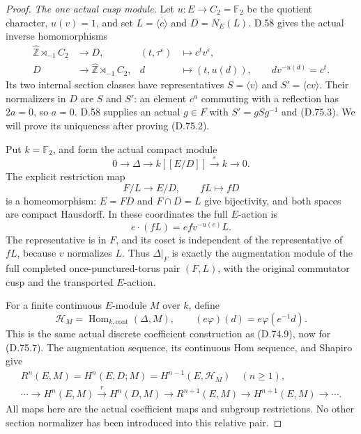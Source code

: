 \begin{proof}
\emph{The one actual cusp module.}
Let $u:E\to C_2=\mathbb F_2$ be the quotient character,
$u(v)=1$, and set
$L=\overline{\langle c\rangle}$ and $D=N_E(L)$.
D.58 gives the actual inverse homomorphisms
\[
 \begin{aligned}
 \widehat{\mathbb Z}\rtimes_{-1}C_2
        &\longrightarrow D,
        &(t,\tau^\epsilon)&\longmapsto c^t v^\epsilon,\\
 D&\longrightarrow\widehat{\mathbb Z}\rtimes_{-1}C_2,
        &d&\longmapsto(t,u(d)),
        \qquad d v^{-u(d)}=c^t .
 \end{aligned}                                             \tag{D.75.6}
\]
Its two internal section classes have representatives
$S=\langle v\rangle$ and $S'=\langle cv\rangle$.
Their normalizers in $D$ are $S$ and $S'$:
an element $c^a$ commuting with a reflection has
$2a=0$, so $a=0$.  D.58 supplies an actual
$g\in F$ with $S'=gSg^{-1}$ and (D.75.3).
We will prove its uniqueness after proving (D.75.2).

Put $k=\mathbb F_2$, and form the actual compact module
\[
 0\longrightarrow\Delta
 \longrightarrow k[[E/D]]
            \xrightarrow{\ \varepsilon\ }k\longrightarrow0 .
                                                               \tag{D.75.7}
\]
The explicit restriction map
\[
            F/L\longrightarrow E/D,\qquad fL\longmapsto fD
                                                               \tag{D.75.8}
\]
is a homeomorphism: $E=FD$ and $F\cap D=L$
give bijectivity, and both spaces are compact Hausdorff.
In these coordinates the full $E$-action is
\[
                   e\cdot(fL)=efv^{-u(e)}L .              \tag{D.75.9}
\]
The representative is in $F$, and its coset is
independent of the representative of $fL$, because
$v$ normalizes $L$.  Thus $\Delta|_F$ is exactly
the augmentation module of the full completed
once-punctured-torus pair $(F,L)$, with the original
commutator cusp and the transported $E$-action.

For a finite continuous $E$-module $M$ over $k$, define
\[
 \mathscr H_M=\operatorname{Hom}_{k,\mathrm{cont}}(\Delta,M),
 \qquad (e\varphi)(d)=e\varphi(e^{-1}d).
                                                               \tag{D.75.10}
\]
This is the same actual discrete coefficient
construction as (D.74.9), now for (D.75.7).
The augmentation sequence, its continuous Hom sequence,
and Shapiro give
\[
 \begin{gathered}
 R^n(E,M)=H^n(E,D;M)=H^{n-1}(E,\mathscr H_M)
                       \quad(n\geq1),\\
 \cdots\longrightarrow H^n(E,M)\xrightarrow{\ r\ }H^n(D,M)
 \longrightarrow R^{n+1}(E,M)
 \longrightarrow H^{n+1}(E,M)\longrightarrow\cdots .
 \end{gathered}                                             \tag{D.75.11}
\]
All maps here are the actual coefficient maps and
subgroup restrictions.  No other section normalizer
has been introduced into this relative pair.


\end{proof}
